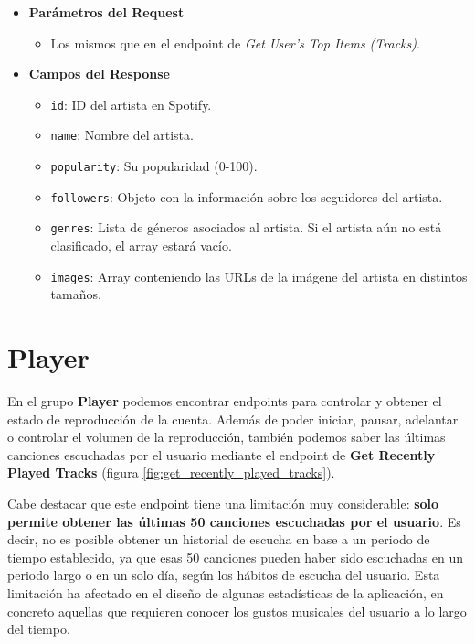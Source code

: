 \begin{itemize}
    \item \textbf{Parámetros del Request}
          \begin{itemize}
              \item Los mismos que en el endpoint de \textit{Get User's Top Items (Tracks)}.
          \end{itemize}

    \item \textbf{Campos del Response}
          \begin{itemize}
              \item \texttt{id}: ID del artista en Spotify.
              \item \texttt{name}: Nombre del artista.
              \item \texttt{popularity}: Su popularidad (0-100).
              \item \texttt{followers}: Objeto con la información sobre los seguidores del artista.
              \item \texttt{genres}: Lista de géneros asociados al artista. Si el artista aún no está clasificado, el array estará vacío.
              \item \texttt{images}: Array conteniendo las URLs de la imágene del artista en distintos tamaños.
          \end{itemize}

\end{itemize}

\section*{Player}

En el grupo \textbf{Player} podemos encontrar endpoints para controlar y obtener el estado de reproducción de la cuenta. Además de poder iniciar, pausar, adelantar o controlar el volumen de la reproducción, también podemos saber las últimas canciones escuchadas por el usuario mediante el endpoint de \textbf{Get Recently Played Tracks} (figura \ref{fig:get_recently_played_tracks}).

Cabe destacar que este endpoint tiene una limitación muy considerable: \textbf{solo permite obtener las últimas 50 canciones escuchadas por el usuario}. Es decir, no es posible obtener un historial de escucha en base a un periodo de tiempo establecido, ya que esas 50 canciones pueden haber sido escuchadas en un periodo largo o en un solo día, según los hábitos de escucha del usuario. Esta limitación ha afectado en el diseño de algunas estadísticas de la aplicación, en concreto aquellas que requieren conocer los gustos musicales del usuario a lo largo del tiempo.

